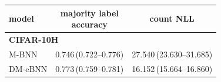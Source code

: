 \begin{tabular}{lcc}
\toprule
model & \shortstack{majority label\\accuracy} & count NLL \\
\midrule
\multicolumn{3}{l}{\textbf{CIFAR-10H}} \\
M-BNN & 0.746\,(0.722--0.776) & 27.540\,(23.630--31.685) \\
DM-eBNN & 0.773\,(0.759--0.781) & 16.152\,(15.664--16.860) \\
\bottomrule
\end{tabular}
